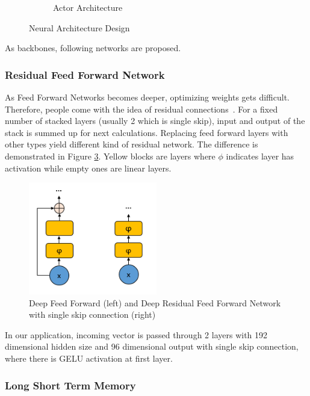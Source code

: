 \documentclass[a4paper, 12pt]{article} %
\begin{document}
\begin{figure}
\begin{subfigure}{.35\textwidth}
		\caption{Actor Architecture}
		\label{fig:actor_net}
	\end{subfigure}
	\caption{Neural Architecture Design}
	\label{fig:nets}
\end{figure}

As backbones, following networks are proposed. 

\subsubsection{Residual Feed Forward Network}

As Feed Forward Networks becomes deeper, optimizing weights gets difficult. 
Therefore, people come with the idea of residual connections~\cite{he_deep_2015}. 
For a fixed number of stacked layers (usually 2 which is single skip), input and output of the stack is summed up for next calculations. 
Replacing feed forward layers with other types yield different kind of residual network. 
The difference is demonstrated in Figure \ref{fig:rffnn_ffnn}.
Yellow blocks are layers where $\phi$ indicates layer has activation while empty ones are linear layers.

\begin{figure}
	\centering
	\includegraphics[width=0.5\textwidth]{figures/ml_theory/rffnn_vs_ffnn.png}
	\caption{Deep Feed Forward (left) and Deep Residual Feed Forward Network with single skip connection (right)}
	\label{fig:rffnn_ffnn}
\end{figure}

In our application, incoming vector is passed through 2 layers with 192 dimensional hidden size and 96 dimensional output with single skip connection, where there is GELU activation at first layer. 
 
\subsubsection{Long Short Term Memory}
\end{document}
